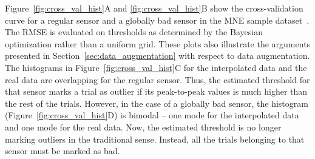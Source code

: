 Figure~\ref{fig:cross_val_hist}A and \ref{fig:cross_val_hist}B show the cross-validation curve for a regular sensor and a globally bad sensor in the MNE sample dataset~\citep{mne,gramfort2013meg}. The RMSE is evaluated on thresholds as determined by the Bayesian optimization rather than a uniform grid. These plots also illustrate the arguments presented in Section~\ref{sec:data_augmentation} with respect to data augmentation. The histograms in Figure~\ref{fig:cross_val_hist}C for the interpolated data and the real data are overlapping for the regular sensor. Thus, the estimated threshold for that sensor marks a trial as outlier if its peak-to-peak values is much higher than the rest of the trials. However, in the case of a globally bad sensor, the histogram (Figure~\ref{fig:cross_val_hist}D) is bimodal -- one mode for the interpolated data and one mode for the real data. Now, the estimated threshold is no longer marking outliers in the traditional sense. Instead, all the trials belonging to that sensor must be marked as bad.
